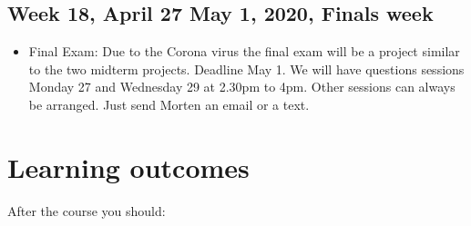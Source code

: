 \documentclass[letterpaper,10pt,english]{sphinxmanual}
\begin{document}
\section{Week 18, April 27\sphinxhyphen{} May 1, 2020, Finals week}
\label{\detokenize{intro:week-18-april-27-may-1-2020-finals-week}}\begin{itemize}
\item {} 
Final Exam:  Due to the Corona virus the final exam will be a project similar to the two midterm projects. Deadline May 1. We will have questions sessions Monday 27 and Wednesday 29 at 2.30pm to 4pm. Other sessions can always be arranged. Just send Morten an email or a text.

\end{itemize}


\chapter{Learning outcomes}
\label{\detokenize{intro:learning-outcomes}}
After the course you should:
\end{document}

